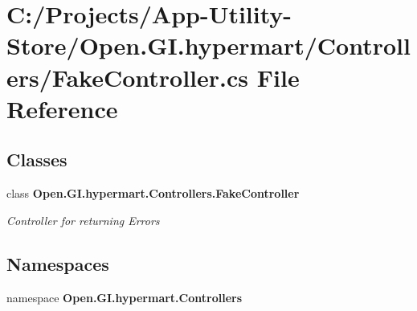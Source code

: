 \section{C\+:/\+Projects/\+App-\/\+Utility-\/\+Store/\+Open.G\+I.\+hypermart/\+Controllers/\+Fake\+Controller.cs File Reference}
\label{_fake_controller_8cs}
\subsection*{Classes}
\begin{DoxyCompactItemize}
\item 
class \textbf{ Open.\+G\+I.\+hypermart.\+Controllers.\+Fake\+Controller}
\begin{DoxyCompactList}\small\item\em Controller for returning Errors \end{DoxyCompactList}\end{DoxyCompactItemize}
\subsection*{Namespaces}
\begin{DoxyCompactItemize}
\item 
namespace \textbf{ Open.\+G\+I.\+hypermart.\+Controllers}
\end{DoxyCompactItemize}
